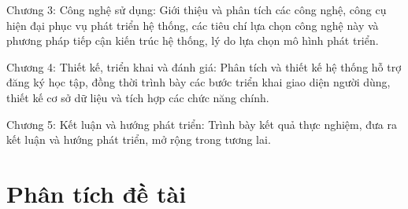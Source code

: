 \documentclass[12pt,a4paper]{report}
\begin{document}
 Chương 3: Công nghệ sử dụng: Giới thiệu và phân tích các công nghệ, công cụ hiện đại phục vụ phát triển hệ thống, các tiêu chí lựa chọn công nghệ này và phương pháp tiếp cận kiến trúc hệ thống, lý do lựa chọn mô hình phát triển.

 Chương 4: Thiết kế, triển khai và đánh giá: Phân tích và thiết kế hệ thống hỗ trợ đăng ký học tập, đồng thời trình bày các bước triển khai giao diện người dùng, thiết kế cơ sở dữ liệu và tích hợp các chức năng chính.

 Chương 5: Kết luận và hướng phát triển: Trình bày kết quả thực nghiệm, đưa ra kết luận và hướng phát triển, mở rộng trong tương lai. 


\chapter{Phân tích đề tài}
\end{document}

